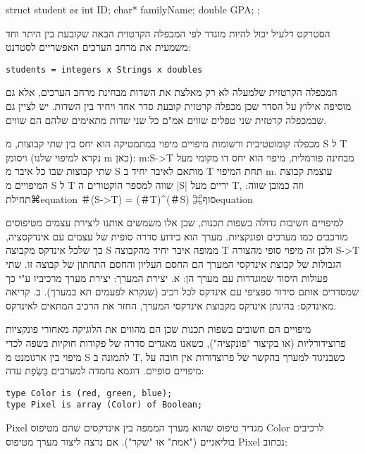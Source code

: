 \begin{CPP}
struct student {¢¢
          int ID;
        char* familyName;
        double GPA;
};
\end{CPP}

      הסטרקט דלעיל יכול להיות מוגדר לפי המכפלה הקרטזית הבאה שקובעת בין היתר וחד משמעית את מרחב הערכים האפשריים לסטדנט:
\begin{verbatim}
students = integers x Strings x doubles
\end{verbatim}
      המכפלה הקרטזית שלמעלה לא רק מאלצת את השדות מבחינת מרחב הערכים, אלא גם מוסיפה אילוץ על הסדר שכן מכפלה קרטזית קובעת סדר אחד ויחיד בין השדות.
      יש לציין גם שבמכפלה קרטזית שני טפלים שווים אמ"ם כל שני שדות מתאימים שלהם הם שווים.

      מכפלה קומוטטיבית ורשומות
      מיפויים
      מיפוי במתמטיקה הוא יחס בין שתי קבוצות, מ S ל T ויסומן (נקרא למיפוי שלנו m כאן):
      m:S->T
      מבחינה פורמלית, מיפוי הוא יחס דו מקומי מעל שתי קבוצות שבו כל איבר מ S מותאם לאיבר יחיד ב T תחת המיפוי m.
      עוצמת קבוצת המיפויים מ S ל T שווה למספר הוקטורים ה |S| יריים מעל T, וזה כמובן שווה:
      ⌘תחילת{equation}
        ＃(S->T) = (＃T)^(＃S)
      ⌘סוף{equation}

      למיפויים חשיבות גדולה בשפות תכנות, שכן אלו משמשים אותנו ליצירת עצמים מטיפוסים
      מורכבים כמו מערכים ופונקציות. מערך הוא כידוע סדרה סופית של עצמים עם אינדקסציה,
      כך שלכל אינדקס מקבוצה S ממופה איבר יחיד מהקבוצה T ולכן זה מיפוי סופי מהצורה
      S->T
      הגבולות של קבוצת אינדקסי המערך הם החסם העליון והחסם התחתון של קבוצה זו. שתי
      פעולות היסוד שמוגדרות עם מערך הן: א. יצירת המערך: יצירת מערך מרכיביו ע"י כך
      שמסדרים אותם סידור ספציפי עם אינדקס לכל רכיב (שנקרא לפעמים תא במערך).
      ב. קריאה מאינדקס: בהינתן אינדקס מקבוצת אינדקסי המערך, החזר את הרכיב המתאים לאינדקס.

      מיפויים הם חשובים בשפות תכנות שכן הם מהווים את הלוגיקה מאחורי פונקציות
      פרוצידורליות (או בקיצור "פונקציה"), כשאנו מאגדים סדרה של פקודות חוקיות בשפה
      לכדי מיפוי בין ארגומנט מ S לתמונה ב T, כשבניגוד למערך בהקשר של פרוצדורות אין
      חובה על מיפויים סופיים. דוגמא נחמדה למערכים בִּשְׂפַת עדה:

\begin{verbatim}
type Color is (red, green, blue);
type Pixel is array (Color) of Boolean;
\end{verbatim}

      Pixel מגדיר טיפוס שהוא מערך הממפה בין אינדקסים שהם מטיפוס Color לרכיבים בוליאניים ("אמת" או "שקר"). אם נרצה ליצור מערך מטיפוס Pixel נכתוב:

